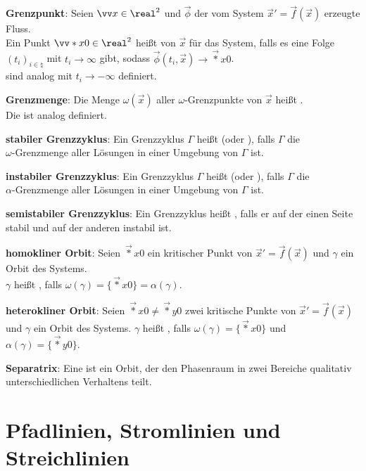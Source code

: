 \textbf{Grenzpunkt}:
Seien $\vec{x} \in \real^2$ und $\vec{\phi}$ der vom System $\vec{x}' = \vec{f}(\vec{x})$
erzeugte Fluss.\\
Ein Punkt $\vec*{x}{0} \in \real^2$ heißt  von $\vec{x}$
für das System, falls es eine Folge $(t_i)_{i \in \natural}$
mit $t_i \to \infty$ gibt, sodass $\vec{\phi}(t_i, \vec{x}) \to \vec*{x}{0}$.\\
 sind analog mit $t_i \to -\infty$ definiert.

\textbf{Grenzmenge}:
Die Menge $\omega(\vec{x})$ aller $\omega$-Grenzpunkte von $\vec{x}$ heißt
.\\
Die  ist analog definiert.

\linie

\textbf{stabiler Grenzzyklus}:
Ein Grenzzyklus $\Gamma$ heißt 
(oder ), falls $\Gamma$ die\\
$\omega$-Grenzmenge aller Lösungen in einer Umgebung von $\Gamma$ ist.

\textbf{instabiler Grenzzyklus}:
Ein Grenzzyklus $\Gamma$ heißt 
(oder ), falls $\Gamma$ die\\
$\alpha$-Grenzmenge aller Lösungen in einer Umgebung von $\Gamma$ ist.

\textbf{semistabiler Grenzzyklus}:
Ein Grenzzyklus heißt , falls er auf der einen Seite stabil und auf der
anderen instabil ist.

\linie

\textbf{homokliner Orbit}:
Seien $\vec*{x}{0}$ ein kritischer Punkt von $\vec{x}' = \vec{f}(\vec{x})$
und $\gamma$ ein Orbit des Systems.\\
$\gamma$ heißt , falls $\omega(\gamma) = \{\vec*{x}{0}\} = \alpha(\gamma)$.

\textbf{heterokliner Orbit}:
Seien $\vec*{x}{0} \not= \vec*{y}{0}$ zwei kritische Punkte von $\vec{x}' = \vec{f}(\vec{x})$
und $\gamma$ ein Orbit des Systems.
$\gamma$ heißt , falls $\omega(\gamma) = \{\vec*{x}{0}\}$
und $\alpha(\gamma) = \{\vec*{y}{0}\}$.

\textbf{Separatrix}:
Eine  ist ein Orbit, der den Phasenraum in zwei Bereiche
qualitativ unterschiedlichen Verhaltens teilt.

\pagebreak

\section{%
    Pfadlinien, Stromlinien und Streichlinien%
}

